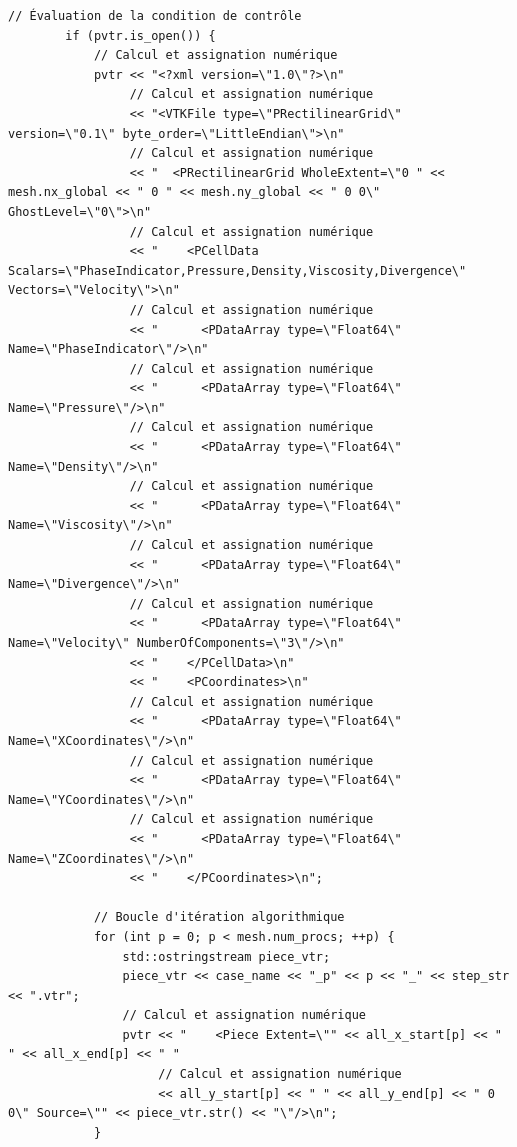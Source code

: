 \documentclass[10pt,a4paper,oneside]{book}
\begin{document}
\begin{lstlisting}[language={[11]C++}]
        // Évaluation de la condition de contrôle
        if (pvtr.is_open()) {
            // Calcul et assignation numérique
            pvtr << "<?xml version=\"1.0\"?>\n"
                 // Calcul et assignation numérique
                 << "<VTKFile type=\"PRectilinearGrid\" version=\"0.1\" byte_order=\"LittleEndian\">\n"
                 // Calcul et assignation numérique
                 << "  <PRectilinearGrid WholeExtent=\"0 " << mesh.nx_global << " 0 " << mesh.ny_global << " 0 0\" GhostLevel=\"0\">\n"
                 // Calcul et assignation numérique
                 << "    <PCellData Scalars=\"PhaseIndicator,Pressure,Density,Viscosity,Divergence\" Vectors=\"Velocity\">\n"
                 // Calcul et assignation numérique
                 << "      <PDataArray type=\"Float64\" Name=\"PhaseIndicator\"/>\n"
                 // Calcul et assignation numérique
                 << "      <PDataArray type=\"Float64\" Name=\"Pressure\"/>\n"
                 // Calcul et assignation numérique
                 << "      <PDataArray type=\"Float64\" Name=\"Density\"/>\n"
                 // Calcul et assignation numérique
                 << "      <PDataArray type=\"Float64\" Name=\"Viscosity\"/>\n"
                 // Calcul et assignation numérique
                 << "      <PDataArray type=\"Float64\" Name=\"Divergence\"/>\n"
                 // Calcul et assignation numérique
                 << "      <PDataArray type=\"Float64\" Name=\"Velocity\" NumberOfComponents=\"3\"/>\n"
                 << "    </PCellData>\n"
                 << "    <PCoordinates>\n"
                 // Calcul et assignation numérique
                 << "      <PDataArray type=\"Float64\" Name=\"XCoordinates\"/>\n"
                 // Calcul et assignation numérique
                 << "      <PDataArray type=\"Float64\" Name=\"YCoordinates\"/>\n"
                 // Calcul et assignation numérique
                 << "      <PDataArray type=\"Float64\" Name=\"ZCoordinates\"/>\n"
                 << "    </PCoordinates>\n";

            // Boucle d'itération algorithmique
            for (int p = 0; p < mesh.num_procs; ++p) {
                std::ostringstream piece_vtr;
                piece_vtr << case_name << "_p" << p << "_" << step_str << ".vtr";
                // Calcul et assignation numérique
                pvtr << "    <Piece Extent=\"" << all_x_start[p] << " " << all_x_end[p] << " "
                     // Calcul et assignation numérique
                     << all_y_start[p] << " " << all_y_end[p] << " 0 0\" Source=\"" << piece_vtr.str() << "\"/>\n";
            }


\end{lstlisting}
\end{document}
